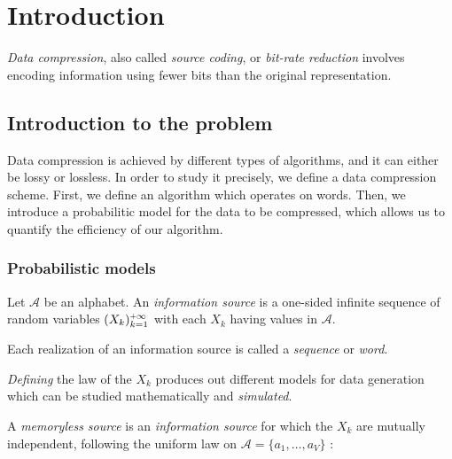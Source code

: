 \section{ Introduction }

\emph{Data compression}, also called \emph{source coding}, or \emph{bit-rate reduction} involves encoding information using fewer bits than the original representation.

\subsection{ Introduction to the problem }

Data compression is achieved by different types of algorithms, and it can either
be lossy or lossless. In order to study it precisely, we define a data compression
scheme. First, we define an algorithm which operates on words. Then, we introduce
a probabilitic model for the data to be compressed, which allows us to quantify
the efficiency of our algorithm.

\subsubsection{ Probabilistic models }

\begin{df}
    \label{def:source}
    Let $\mathcal{A}$ be an alphabet.
    An \emph{information source} is a one-sided infinite sequence of random
    variables $(X_k)_{k=1}^{\pinf}$ with each $X_k$ 
    having values in $\mathcal{A}$.
\end{df}

\begin{rmk}
    \label{rmk:sequence}
    Each realization of an information source is called a 
    \emph{sequence} or \emph{word}.
\end{rmk}

\begin{rmk}
    \label{rmk:source}
    \emph{Defining} the law of the $X_k$ produces out different
    models for data generation which can be studied mathematically
    and \emph{simulated}.
\end{rmk}

\begin{df}
    \label{def:memoryless}
    A \emph{memoryless source} is an \emph{information source}
    for which the $X_k$ are mutually independent, following
    the uniform law on $\mathcal{A} = \{ a_1, \dots, a_V \}$ :
\end{df}

